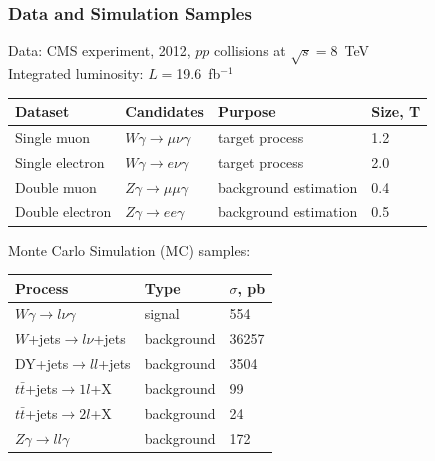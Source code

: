 \begin{frame}\frametitle{Data and Simulation Samples}
\scriptsize
Data: CMS experiment, 2012,  $pp$ collisions at $\sqrt{s}=$8~TeV\\
Integrated luminosity: $L=$19.6~fb$^{-1}$ 

\begin{table}[h]
  \scriptsize
  \begin{center}
    \begin{tabular}{|l|l|l|l|}
      \hline
      Dataset          & Candidates                        &  Purpose   & Size, T   \\ \hline
      Single muon      & $W\gamma\rightarrow\mu\nu\gamma$  &  target process   & 1.2 \\ \hline %
      Single electron  & $W\gamma\rightarrow e\nu\gamma$   &  target process   & 2.0 \\ \hline %
      Double muon      & $Z\gamma\rightarrow\mu\mu\gamma$  &  background estimation   & 0.4 \\ \hline %
      Double electron  & $Z\gamma\rightarrow ee\gamma$     &  background estimation   & 0.5 \\ \hline %
    \end{tabular}
  \end{center}
\end{table} 

\scriptsize
Monte Carlo Simulation (MC) samples:\\

\begin{table}[h]
  \scriptsize
  \begin{center}
    \begin{tabular}{|l|l|l|}
      \hline
      Process                              & Type & $\sigma$, pb  \\ \hline
      $W\gamma \rightarrow l\nu\gamma$     & signal & 554   \\ \hline %
      $W$+jets$ \rightarrow l\nu $+jets   & background & 36257  \\ \hline %
      DY+jets$ \rightarrow ll $+jets     & background & 3504  \\ \hline %
      $t\bar{t}$+jets$\rightarrow 1l$+X    & background & 99    \\ \hline %
      $t\bar{t}$+jets$\rightarrow 2l$+X    & background & 24    \\ \hline
      $Z\gamma \rightarrow ll\gamma$       & background & 172   \\ \hline
    \end{tabular}
    \label{tab:mc_bkg_samples}
  \end{center}
\end{table} 

\end{frame}%

